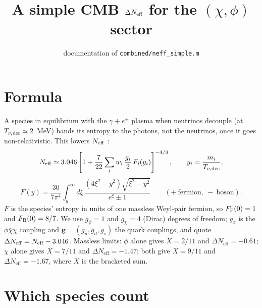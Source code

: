 \documentclass{article}
\title{A simple CMB $\dNeff$ for the $(\chi,\phi)$ sector}
\author{documentation of \texttt{combined/neff\_simple.m}}
\date{}
\newcommand{\dNeff}{\Delta N_{\mathrm{eff}}}
\newcommand{\Tnu}{T_{\nu,\mathrm{dec}}}
\begin{document}
\maketitle

\section{Formula}

A species in equilibrium with the $\gamma+e^\pm$ plasma when neutrinos decouple
(at $\Tnu \simeq 2$~MeV) hands its entropy to the photons, not the neutrinos,
once it goes non-relativistic. This lowers $N_{\rm eff}$ \cite{Boehm:2013jpa}:
\begin{equation}
  N_{\rm eff} \simeq 3.046\left[1 + \frac{7}{22}\sum_i w_i\,\frac{g_i}{2}\,F_i(y_i)\right]^{-4/3},
  \qquad y_i = \frac{m_i}{\Tnu},
\end{equation}
\begin{equation}
  F(y) = \frac{30}{7\pi^4}\int_y^\infty d\xi\,
         \frac{(4\xi^2-y^2)\sqrt{\xi^2-y^2}}{e^\xi \pm 1}
  \qquad (+\ \text{fermion},\ -\ \text{boson}).
\end{equation}
$F$ is the species' entropy in units of one massless Weyl-pair fermion, so
$F_{\rm F}(0)=1$ and $F_{\rm B}(0)=8/7$. We use $g_\phi=1$ and $g_\chi=4$ (Dirac) degrees of freedom; $g_x$ is the $\phi\bar\chi\chi$ coupling and $\mathbf g=(g_u,g_d,g_s)$ the quark couplings,
and quote $\dNeff = N_{\rm eff}-3.046$. Massless limits: $\phi$ alone gives
$X = 2/11$ and $\dNeff=-0.61$; $\chi$ alone gives $X=7/11$ and $\dNeff=-1.47$;
both give $X = 9/11$ and $\dNeff=-1.67$, where $X$ is the bracketed sum.

\section{Which species count}
\end{document}
